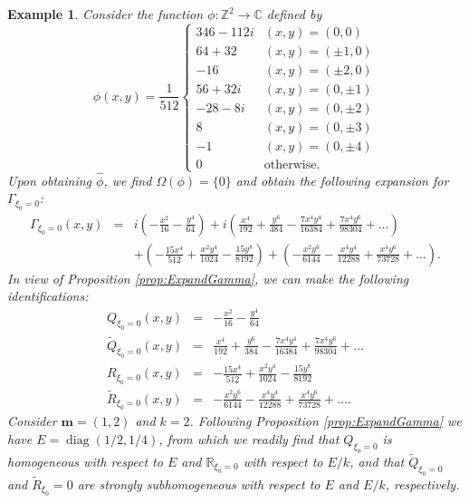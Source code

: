 \documentclass[11pt]{article}
\newtheorem{example}{Example}
\theoremstyle{remark}
\newcommand\diag{\operatorname{diag}}
\newcommand\R{\mathbb{R}}
\newcommand{\lp}{\left(}
\newcommand{\rp}{\right)}
\newcommand{\f}[2]{\frac{#1}{#2}}
\begin{document}
\begin{example}\normalfont
Consider the function $\phi : \mathbb{Z}^2 \to \mathbb{C}$ defined by 
\begin{equation*}
    \phi(x,y) =
    \frac{1}{512}
    \begin{cases}
    346 - 112i &(x,y) = (0,0)\\
    64 + 32  &(x,y) = (\pm 1, 0)\\
    -16        &(x,y) = (\pm 2,0)\\
    56 + 32i  &(x,y) = (0,\pm 1)\\
    - 28 - 8i &(x,y) = (0,\pm 2)\\
    8     &(x,y) = (0,\pm 3)\\
    -1 &(x,y) = (0,\pm 4)\\
    0& \text{otherwise}.
    \end{cases}
\end{equation*}
Upon obtaining $\widehat{\phi}$, we find $\Omega(\phi) = \{ 0 \}$ and obtain the following expansion for $\Gamma_{\xi_0 =0}$:
\begin{eqnarray*}
\Gamma_{\xi_0 = 0}(x,y) 
&=& i\lp -\frac{x^2}{16} -\frac{y^4}{64}\rp + 
i\lp \frac{x^4}{192} + \frac{y^6}{384} - \frac{7 x^4y^4}{16384} + \frac{7x^4y^6}{98304}+ \dots\rp \\
&& + \lp -\frac{15x^4}{512} + \frac{x^2 y^4}{1024} - \f{15y^8}{8192} \rp 
+ \lp  -\frac{x^2y^6}{6144} - \frac{x^4y^4}{12288} + \frac{x^4y^6}{73728} + \dots\rp.
\end{eqnarray*}
In view of Proposition \ref{prop:ExpandGamma}, we can make the following identifications:
\begin{eqnarray*}
Q_{\xi_0 = 0}(x,y)
&=&  -\frac{x^2}{16} -\frac{y^4}{64}\\
\widetilde{Q}_{\xi_0 = 0}(x,y)
&=&   \frac{x^4}{192} + \frac{y^6}{384} - \frac{7 x^4y^4}{16384} + \frac{7x^4y^6}{98304}+ \dots\\
R_{\xi_0 = 0}(x,y)
&=&  -\frac{15x^4}{512} + \frac{x^2 y^4}{1024} - \f{15y^8}{8192} \\
\widetilde{R}_{\xi_0 = 0}(x,y)
&=& -\frac{x^2y^6}{6144} - \frac{x^4y^4}{12288} + \frac{x^4y^6}{73728} + \dots.
\end{eqnarray*}
Consider $\mathbf{m} = (1,2)$ and $k=2$. Following Proposition \ref{prop:ExpandGamma} we have $E = \diag(1/2, 1/4)$, from which we readily find that $Q_{\xi_0=0}$ is homogeneous with respect to $E$ and $\R_{\xi_0 = 0}$ with respect to $E/k$, and that $\widetilde{Q}_{\xi_0 = 0}$ and $\widetilde{R}_{\xi_0} = 0$ are strongly subhomogeneous with respect to $E$ and $E/k$, respectively. \\
\end{example}
\end{document}
